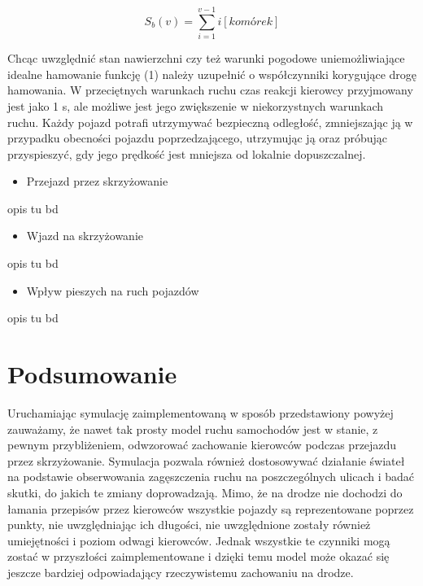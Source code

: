 \documentclass{sprawozdanie-agh}
\begin{document}
		\begin{equation}
			S_{b}(v)=\sum_{i=1}^{v-1} i[komórek]
		\end{equation}

		Chcąc uwzględnić stan nawierzchni czy też warunki pogodowe uniemożliwiające idealne hamowanie funkcję (1) należy uzupełnić o współczynniki korygujące drogę hamowania.
		W przeciętnych warunkach ruchu czas reakcji kierowcy przyjmowany jest jako 1 s, ale możliwe jest jego zwiększenie w niekorzystnych warunkach ruchu.
		Każdy pojazd potrafi utrzymywać bezpieczną odległość, zmniejszając ją w przypadku obecności pojazdu poprzedzającego, utrzymując ją oraz próbując przyspieszyć, gdy jego prędkość jest mniejsza od lokalnie dopuszczalnej.

		\begin{itemize}
			\item 	Przejazd przez skrzyżowanie
		\end{itemize}

		opis tu bd

		\begin{itemize}
			\item 	Wjazd na skrzyżowanie
		\end{itemize}

		opis tu bd

		\begin{itemize}
			\item 	Wpływ pieszych na ruch pojazdów
		\end{itemize}

		opis tu bd


		\section{Podsumowanie}

		Uruchamiając symulację zaimplementowaną w sposób przedstawiony powyżej zauważamy, że nawet tak prosty model ruchu samochodów jest w stanie, z pewnym przybliżeniem, odwzorować zachowanie kierowców podczas przejazdu przez skrzyżowanie. Symulacja pozwala również dostosowywać działanie świateł na podstawie obserwowania zagęszczenia ruchu na poszczególnych ulicach i badać skutki, do jakich te zmiany doprowadzają. Mimo, że na drodze nie dochodzi do łamania przepisów przez kierowców wszystkie pojazdy są reprezentowane poprzez punkty, nie uwzględniając ich długości, nie uwzględnione zostały również umiejętności i poziom odwagi kierowców. Jednak wszystkie te czynniki mogą zostać w przyszłości zaimplementowane i dzięki temu model może okazać się jeszcze bardziej odpowiadający rzeczywistemu zachowaniu na drodze.
\end{document}

